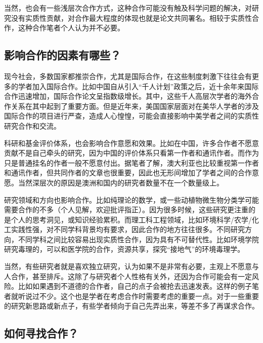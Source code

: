 \documentclass[
]{book}
\begin{document}
当然，也会有一些浅层次合作方式，这种合作可能没有触及科学问题的解决，对研究没有实质性贡献，对合作最大程度的体现也就是论文共同署名。相较于实质性合作，这种合作笔者个人认为并不必要。

\hypertarget{ux5f71ux54cdux5408ux4f5cux7684ux56e0ux7d20ux6709ux54eaux4e9b}{%
\subsection{影响合作的因素有哪些？}\label{ux5f71ux54cdux5408ux4f5cux7684ux56e0ux7d20ux6709ux54eaux4e9b}}

现今社会，多数国家都推崇合作，尤其是国际合作，在这些制度刺激下往往会有更多的学者加入国际合作。比如中国自从引入``千人计划''政策之后，近十余年来国际合作迅速增加，国际合作论文呈指数级增长。其中，这些千人高层次学者的海外合作关系在其中起到了重要方面。但是近年来，美国国家层面对在美华人学者的涉及国际合作的项目进行严查，造成人心惶惶，可能会直接影响中美学者之间的实质性研究合作和交流。

科研和基金评价体系，也会影响合作意愿和效果。比如在中国，许多合作者不愿意贡献不是自己牵头的研究，因为中国的评价体系只看第一作者和通讯作者。而作为只是普通挂名的作者一般不愿意付出。据笔者了解，澳大利亚也比较重视第一作者和通讯作者，但共同作者的文章也很重要，因此也无形间增加了学者之间的合作意愿。当然深层次的原因是澳洲和国内的研究者数量不在一个数量级上。

研究领域和方向也影响合作。比如纯理论的数学，或一些动植物微生物分类学可能需要合作的不多（个人见解，欢迎批评指正）。因为很多时候，这些研究更注重的是个人的思考洞见，或知识经验累积。而理工科工程领域，比如环境科学/农学/化工实践性强，对不同学科背景均有要求，因此合作的地方往往很多。不同研究方向，不同学科之间比较容易出现实质性合作，因为具有不可替代性。比如环境学院研究毒理的，可以和医学院的合作，资源共享，探究``接地气''的环境毒理学。

当然，有些研究者就是喜欢独立研究，认为如果不是非常有必要，主观上不愿意与人合作，甚至排斥。这除了与研究者个人性格有关外，还因为合作可能会有一定风险。比如如果遇到不道德的合作者，自己的点子会被抢去迅速发表。这样的例子笔者就听说过不少。这个也是学者在考虑合作时需要考虑的重要一点。对于一些重要的研究新思路或新点子，有些学者倾向于自己先弄出来，等差不多了再谋求合作。

\hypertarget{ux5982ux4f55ux5bfbux627eux5408ux4f5c}{%
\subsection{如何寻找合作？}\label{ux5982ux4f55ux5bfbux627eux5408ux4f5c}}
\end{document}
